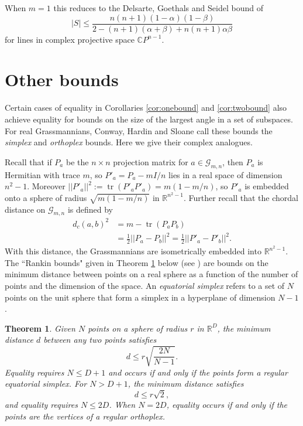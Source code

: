 \documentclass[12pt]{article}
\numberwithin{equation}{section}
\theoremstyle{plainsl}
\newtheorem{theorem}{Theorem}[section]
\newcommand\defn[1]{\textsl{#1}}
\newcommand\al{\alpha}
\newcommand\be{\beta}
\newcommand\cx{{\mathbb C}}%
\newcommand\re{{\mathbb R}}%
\newcommand\gras[2]{\mathcal{G}_{#1,#2}}
\newcommand\opk[1]{\mathop{\mathrm{#1}}\nolimits}
\newcommand\tr{\opk{tr}}
\begin{document}
When $m = 1$ this reduces to the Delsarte, Goethals and Seidel bound of 
\[
|S| \leq \frac{n(n+1)(1-\al)(1-\be)}{2-(n+1)(\al+\be) + n(n+1)\al\be}
\]
for lines in complex projective space $\cx P^{n-1}$.

\section{Other bounds}
\label{sec:otherbounds}

Certain cases of equality in Corollaries \ref{cor:onebound} and \ref{cor:twobound} also achieve equality for bounds on the size of the largest angle in a set of subspaces. For real Grassmannians, Conway, Hardin and Sloane \cite{chs} call these bounds the \defn{simplex} and \defn{orthoplex} bounds. Here we give their complex analogues. 

Recall that if $P_a$ be the $n \times n$ projection matrix for $a \in \gras{m}{n}$, then $P_a$ is Hermitian with trace $m$, so $P'_a = P_a - mI/n$ lies in a real space of dimension $n^2-1$. Moreover $||P'_a||^2 := \tr(P'_aP'_a) = m(1-m/n)$, so $P'_a$ is embedded onto a sphere of radius $\sqrt{m(1-m/n)}$ in $\re^{n^2-1}$. Further recall that the chordal distance on $\gras{m}{n}$ is defined by 
\begin{align*}
d_c(a,b)^2 & = m - \tr(P_aP_b) \\
& = \frac{1}{2}||P_a - P_b||^2 = \frac{1}{2}||P'_a - P'_b||^2.
\end{align*}
With this distance, the Grassmannians are isometrically embedded into $\re^{n^2-1}$. The ``Rankin bounds" given in Theorem \ref{thm:rankin} below (see \cite[Theorems 6.1.1 \& 6.1.2]{bor}) are bounds on the minimum distance between points on a real sphere as a function of the number of points and the dimension of the space. An \defn{equatorial simplex} refers to a set of $N$ points on the unit sphere that form a simplex in a hyperplane of dimension $N-1$.

\begin{theorem}
\label{thm:rankin}
Given $N$ points on a sphere of radius $r$ in $\re^D$, the minimum distance $d$ between any two points satisfies 
\[
d \leq r\sqrt{\frac{2N}{N-1}}.
\]
Equality requires $N \leq D+1$ and occurs if and only if the points form a regular equatorial simplex. For $N > D+1$, the minimum distance satisfies
\[
d \leq r\sqrt{2},
\]
and equality requires $N \leq 2D$. When $N = 2D$, equality occurs if and only if the points are the vertices of a regular orthoplex.
\end{theorem}
\end{document}
